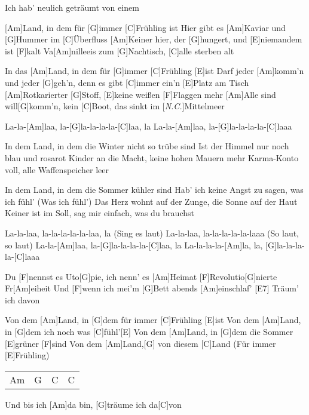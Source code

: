 

\begin{guitar}
	[\textit{N.C.}]Ich hab' neulich geträumt von einem
	
	[Am]Land, in dem für [G]immer [C]Frühling ist
	Hier gibt es [Am]Kaviar und [G]Hummer im [C]{Ü}berfluss
	[Am]Keiner hier, der [G]hungert, und [E]niemandem ist [F]kalt
	Va[Am]nilleeis zum [G]Nachtisch, [C]alle sterben alt
	
	In das [Am]Land, in dem für [G]immer [C]Frühling [E]ist
	Darf jeder [Am]komm'n und jeder [G]geh'n, denn es gibt [C]immer ein'n [E]Platz am Tisch
	[Am]Rotkarierter [G]Stoff, [E]keine weißen [F]Flaggen mehr
	[Am]Alle sind will[G]komm'n, kein [C]Boot, das sinkt im [\textit{N.C.}]Mittelmeer
	
	\begin{highlightbar}
		La-la-[Am]laa, la-[G]la-la-la-la-[C]laa, la
		La-la-[Am]laa, la-[G]la-la-la-la-[C]laaa
	\end{highlightbar}
	
	\songsection{Strophe 2}
	In dem Land, in dem die Winter nicht so trübe sind
	Ist der Himmel nur noch blau und rosarot
	Kinder an die Macht, keine hohen Mauern mehr
	Karma-Konto voll, alle Waffenspeicher leer
	
	In dem Land, in dem die Sommer kühler sind
	Hab' ich keine Angst zu sagen, was ich fühl' (Was ich fühl')
	Das Herz wohnt auf der Zunge, die Sonne auf der Haut
	Keiner ist im Soll, sag mir einfach, was du brauchst
	
	\begin{highlightbar}
		\songsection{Refrain 2}
		La-la-laa, la-la-la-la-la-laa, la (Sing es laut)
		La-la-laa, la-la-la-la-la-laaa (So laut, so laut)
		La-la-[Am]laa, la-[G]la-la-la-la-[C]laa, la
		La-la-la-la-[Am]la, la, [G]la-la-la-la-[C]laaa
	\end{highlightbar}
	\pagebreak
	Du [F]nennst es Uto[G]pie, ich nenn' es [Am]Heimat
	[F]Revolutio[G]nierte Fr[Am]eiheit
	Und [F]wenn ich mei'm [G]Bett abends [Am]einschlaf'
	[E7] Träum' ich davon
	
	Von dem [Am]Land, in [G]dem für immer [C]Frühling [E]ist
	Von dem [Am]Land, in [G]dem ich noch was [C]fühl'[E]{}
	Von dem [Am]Land, in [G]dem die Sommer [E]grüner [F]sind
	Von dem [Am]Land,[G] von diesem [C]Land (Für immer [E]Frühling)
	
	{\footnotesize\begin{tabular}{|l|l|l|l|}
			Am & G & C & C 
		\end{tabular} }
	Und bis ich [Am]da bin, [G]träume ich da[C]von
\end{guitar}